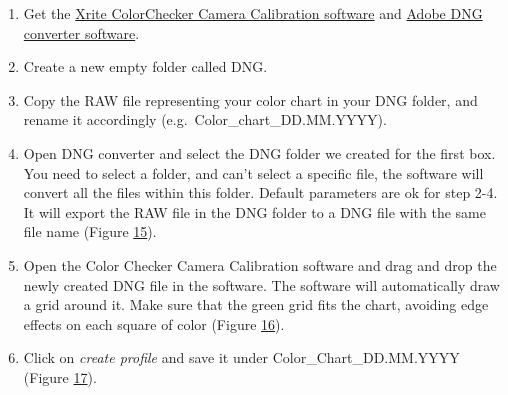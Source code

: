 \documentclass[
]{book}
\begin{document}
\begin{enumerate}
\def\labelenumi{\arabic{enumi}.}
\item
  Get the \href{https://xritephoto.com/ph_product_overview.aspx?ID=938\&Action=Support\&SoftwareID=2030}{Xrite ColorChecker Camera Calibration
  software}
  and \href{https://helpx.adobe.com/photoshop/using/adobe-dng-converter.html}{Adobe DNG converter
  software}.
\item
  Create a new empty folder called DNG.
\item
  Copy the RAW file representing your color chart in your DNG folder,
  and rename it accordingly (e.g.~Color\_chart\_DD.MM.YYYY).
\item
  Open DNG converter and select the DNG folder we created for the
  first box. You need to select a folder, and can't select a specific
  file, the software will convert all the files within this folder.
  Default parameters are ok for step 2-4. It will export the RAW file
  in the DNG folder to a DNG file with the same file name (Figure
  \protect\hyperlink{adobe_dng}{15}).
\item
  Open the Color Checker Camera Calibration software and drag and drop
  the newly created DNG file in the software. The software will
  automatically draw a grid around it. Make sure that the green grid
  fits the chart, avoiding edge effects on each square of color
  (Figure \protect\hyperlink{color_checker_camera_calibration}{16}).
\item
  Click on \emph{create profile} and save it under Color\_Chart\_DD.MM.YYYY
  (Figure \protect\hyperlink{color_checker_profile}{17}).
\end{enumerate}
\end{document}
